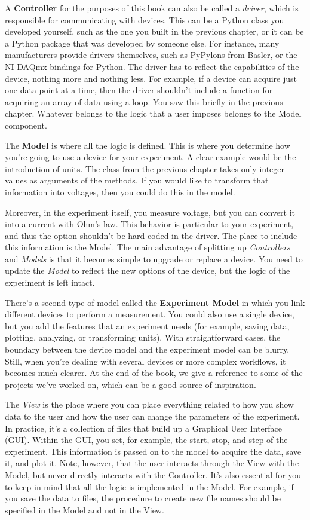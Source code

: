 A \textbf{Controller} for the purposes of this book can also be called a \emph{driver}, which is responsible for communicating with devices. This can be a Python class you developed yourself, such as the one you built in the previous chapter, or it can be a Python package that was developed by someone else. For instance, many manufacturers provide drivers themselves, such as PyPylons from Basler, or the NI-DAQmx bindings for Python. The driver has to reflect the capabilities of the device, nothing more and nothing less. For example, if a device can acquire just one data point at a time, then the driver shouldn't include a function for acquiring an array of data using a loop. You saw this briefly in the previous chapter. Whatever belongs to the logic that a user imposes belongs to the Model component.

The \textbf{Model} is where all the logic is defined. This is where you determine how you're going to use a device for your experiment. A clear example would be the introduction of units. The  class from the previous chapter takes only integer values as arguments of the methods. If you would like to transform that information into voltages, then you could do this in the model.

Moreover, in the experiment itself, you measure voltage, but you can convert it into a current with Ohm's law. This behavior is particular to your experiment, and thus the option shouldn't be hard coded in the driver. The place to include this information is the Model. The main advantage of splitting up \emph{Controllers} and \emph{Models} is that it becomes simple to upgrade or replace a device. You need to update the \emph{Model} to reflect the new options of the device, but the logic of the experiment is left intact.

There's a second type of model called the \textbf{Experiment Model} in which you link different devices to perform a measurement. You could also use a single device, but you add the features that an experiment needs (for example, saving data, plotting, analyzing, or transforming units). With straightforward cases, the boundary between the device model and the experiment model can be blurry. Still, when you're dealing with several devices or more complex workflows, it becomes much clearer. At the end of the book, we give a reference to some of the projects we've worked on, which can be a good source of inspiration.

The \emph{View} is the place where you can place everything related to how you show data to the user and how the user can change the parameters of the experiment. In practice, it's a collection of files that build up a Graphical User Interface ({GUI}). Within the {GUI}, you set, for example, the start, stop, and step of the experiment. This information is passed on to the model to acquire the data, save it, and plot it. Note, however, that the user interacts through the View with the Model, but never directly interacts with the Controller. It's also essential for you to keep in mind that all the logic is implemented in the Model. For example, if you save the data to files, the procedure to create new file names should be specified in the Model and not in the View.

